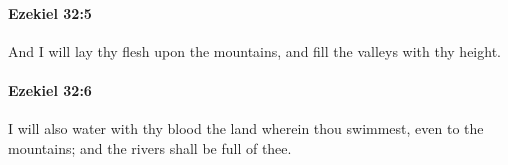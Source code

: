 		\paragraph{Ezekiel 32:5} %
			\label{EZEKIEL-32-5}

			And I will lay thy flesh upon the mountains, and fill the valleys with thy height.


		\paragraph{Ezekiel 32:6} %
			\label{EZEKIEL-32-6}

			I will also water with thy blood the land wherein thou swimmest, even to the mountains; and the rivers shall be full of thee.


